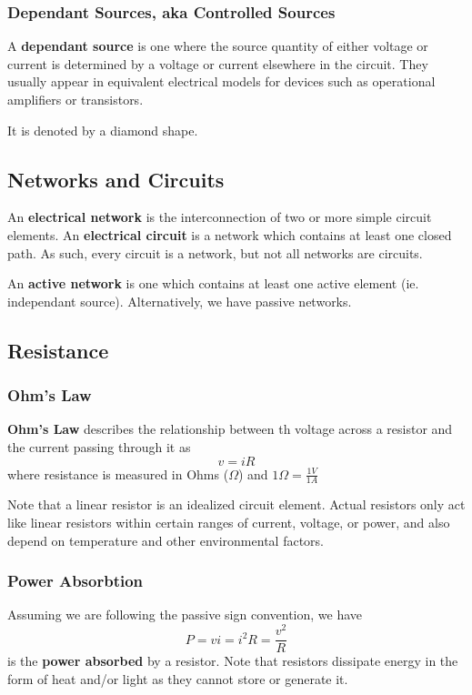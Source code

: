 \documentclass[12pt]{article}
\begin{document}
\subsubsection*{Dependant Sources, aka Controlled Sources}
A {\bf dependant source} is one where the source quantity of either voltage or current is determined by a voltage or current elsewhere in the circuit. They usually appear in equivalent electrical models for devices such as operational amplifiers or transistors.

It is denoted by a diamond shape.

\subsection*{Networks and Circuits}
An {\bf electrical network} is the interconnection of two or more simple circuit elements. An {\bf electrical circuit} is a network which contains at least one closed path. As such, every circuit is a network, but not all networks are circuits.

An {\bf active network} is one which contains at least one active element (ie. independant source). Alternatively, we have passive networks.

\subsection*{Resistance}
\subsubsection*{Ohm's Law}
{\bf Ohm's Law} describes the relationship between th voltage across a resistor and the current passing through it as \[ v = iR \] where resistance is measured in Ohms ($\Omega$) and $1\Omega = \frac{1V}{1A}$

Note that a linear resistor is an idealized circuit element. Actual resistors only act like linear resistors within certain ranges of current, voltage, or power, and also depend on temperature and other environmental factors.

\subsubsection*{Power Absorbtion}
Assuming we are following the passive sign convention, we have \[ P =vi = i^2R = \frac{v^2}{R} \] is the {\bf power absorbed} by a resistor. Note that resistors dissipate energy in the form of heat and/or light as they cannot store or generate it.
\end{document}

